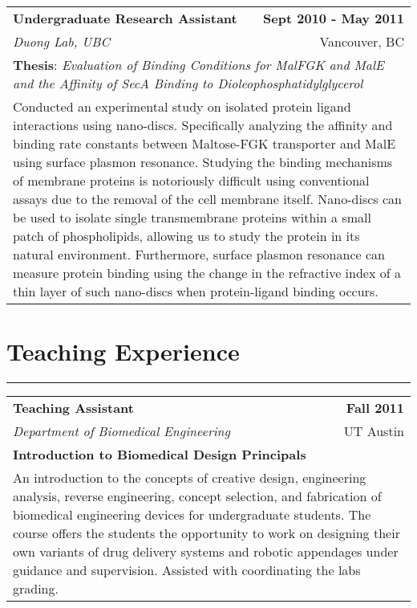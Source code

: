 \documentclass[11pt]{article}
\begin{document}
\begin{tabularx}{0.965\textwidth}{X r}
  \textbf{Undergraduate Research Assistant} & \textbf{Sept 2010 - May 2011} \\
  \textit{Duong Lab, UBC} & Vancouver, BC \\
\multicolumn{2}{p{\dimexpr0.965\textwidth-2\tabcolsep-2\arrayrulewidth}}{\textbf{Thesis}: \textit{Evaluation of Binding Conditions for MalFGK and MalE and the Affinity of SecA Binding to 			Dioleophosphatidylglycerol}
}\\
\multicolumn{2}{p{\dimexpr0.965\textwidth-2\tabcolsep-2\arrayrulewidth}}{Conducted an experimental study on isolated protein ligand interactions using nano-discs. Specifically analyzing the affinity and binding rate constants between Maltose-FGK transporter and MalE using surface plasmon resonance. Studying the binding mechanisms of membrane proteins is notoriously difficult using conventional assays due to the removal of the cell membrane itself. Nano-discs can be used to isolate single transmembrane proteins within a small patch of phospholipids, allowing us to study the protein in its natural environment. Furthermore, surface plasmon resonance can measure protein binding using the change in the refractive index of a thin layer of such nano-discs when protein-ligand binding occurs.
}\\
\end{tabularx}




\section{Teaching Experience}
\hrule
\normalsize

\vspace{1em}


\begin{tabularx}{0.965\textwidth}{X r}
 \textbf{Teaching Assistant} & \textbf{Fall 2011} \\
 \it Department of Biomedical Engineering & UT Austin	\\
 \textbf{Introduction to Biomedical Design Principals} \\
 \multicolumn{2}{p{\dimexpr0.965\textwidth-2\tabcolsep-2\arrayrulewidth}}{An introduction to the concepts of creative design, engineering analysis, reverse engineering, concept selection, and fabrication of biomedical engineering devices for undergraduate students. The course offers the students the opportunity to work on designing their own variants of drug delivery systems and robotic appendages under guidance and supervision. Assisted with coordinating the labs grading.
}\\
\end{tabularx}
\end{document}
